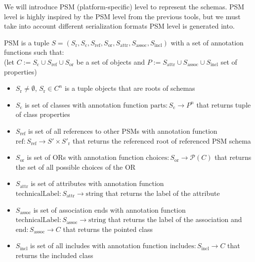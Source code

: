 We will introduce PSM (platform-specific) level to represent the schemas. PSM level is highly inspired by the PSM level from the previous tools, but we must take into account different serialization formats PSM level is generated into.

\begin{definition}[PSM]
    PSM is a tuple $S=(S_{\textrm{r}}, S_{\textrm{c}}, S_{\textrm{ref}}, S_{\textrm{or}}, S_{\textrm{attr}}, S_{\textrm{assoc}}, S_{\textrm{incl}})$ with a set of annotation functions such that:
    \\(let $C:=S_{\textrm{c}}\cup S_{\textrm{ref}}\cup S_{\textrm{or}}$ be a set of objects and $P:=S_{\textrm{attr}}\cup S_{\textrm{assoc}}\cup S_{\textrm{incl}}$ set of properties)
    \begin{itemize}
        \item $S_{\textrm{r}} \neq \emptyset$, $S_{\textrm{r}} \in C^n$ is a tuple objects that are roots of schemas
        \item $S_{\textrm{c}}$ is set of classes with annotation function $\textrm{parts}: S_{\textrm{c}} \rightarrow P^n$ that returns tuple of class properties
        \item $S_{\textrm{ref}}$ is set of all references to other PSMs with annotation function $\textrm{ref}: S_{\textrm{ref}} \rightarrow S' \times S'_{\textrm{r}}$ that returns the referenced root of referenced PSM schema
        \item $S_{\textrm{or}}$ is set of ORs with annotation function $\textrm{choices}: S_{\textrm{or}} \rightarrow \mathcal{P}(C)$ that returns the set of all possible choices of the OR
        \item $S_{\textrm{attr}}$ is set of attributes with annotation function $\textrm{technicalLabel}: S_{\textrm{attr}} \rightarrow \textrm{string}$ that returns the label of the attribute
        \item $S_{\textrm{assoc}}$ is set of association ends with annotation function $\textrm{technicalLabel}: S_{\textrm{assoc}} \rightarrow \textrm{string}$ that returns the label of the association and $\textrm{end}: S_{\textrm{assoc}} \rightarrow C$ that returns the pointed class
        \item $S_{\textrm{incl}}$ is set of all includes with annotation function $\textrm{includes}: S_{\textrm{incl}} \rightarrow C$ that returns the included class
    \end{itemize}
\end{definition}

